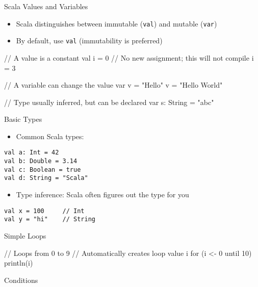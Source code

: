 \begin{frame}[fragile]{Scala Values and Variables}
\begin{itemize}
    \item Scala distinguishes between immutable (\texttt{val}) and mutable (\texttt{var})
    \item By default, use \texttt{val} (immutability is preferred)
\end{itemize}
\begin{chisel}
// A value is a constant
val i = 0
// No new assignment; this will not compile
i = 3

// A variable can change the value
var v = "Hello"
v = "Hello World"

// Type usually inferred, but can be declared
var s: String = "abc"
\end{chisel}
\end{frame}

\begin{frame}[fragile]{Basic Types}
\begin{itemize}
    \item Common Scala types:
\end{itemize}

\begin{verbatim}
val a: Int = 42
val b: Double = 3.14
val c: Boolean = true
val d: String = "Scala"
\end{verbatim}

\begin{itemize}
    \item Type inference: Scala often figures out the type for you
\end{itemize}

\begin{verbatim}
val x = 100     // Int
val y = "hi"    // String
\end{verbatim}
\end{frame}

\begin{frame}[fragile]{Simple Loops}
\begin{chisel}
// Loops from 0 to 9
// Automatically creates loop value i
for (i <- 0 until 10) {
  println(i)
}
\end{chisel}
\end{frame}

\begin{frame}[fragile]{Conditions}
\end{frame}

